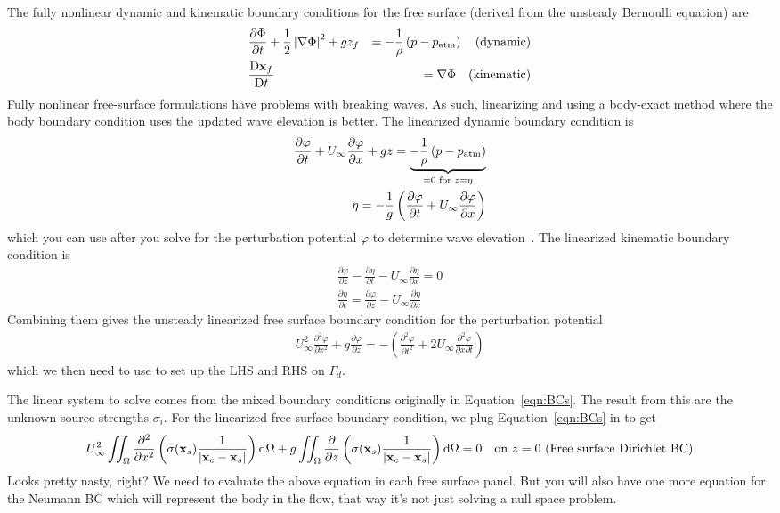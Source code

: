 \documentclass[10pt]{article}
\newcommand{\pp}[2]{\frac{\partial #1}{\partial #2}}
\newcommand{\ppt}[2]{\frac{\partial^2 #1}{\partial #2^2}}
\newcommand{\DD}[2]{\frac{\textrm{D} #1}{\textrm{D} #2}}
\newcommand{\mbf}[1]{\mathbf{#1}}
\newcommand{\half}{\frac{1}{2}}
\newcommand{\be}{\begin{eqnarray}}
\newcommand{\ee}{\end{eqnarray}}
\newcommand{\ben}{\begin{eqnarray*}}
\newcommand{\een}{\end{eqnarray*}}
\newcommand{\Uinf}{U_{\infty}}
\newcommand{\patm}{p_{\textrm{atm}}}
\newcommand{\tn}[1]{\textnormal{#1}}
\begin{document}
The fully nonlinear dynamic and kinematic boundary conditions for the free surface (derived from the unsteady Bernoulli equation) are
\be
\label{eqn:FSBC}
& {\pp{\Phi}{t}}
+ \half \left| \nabla \Phi \right|^2
+ gz_f
&=
-\frac{1}{\rho}\left(p - p_{\tn{atm}}\right)
\quad \tn{(dynamic)}
\\
& \DD{\mbf{x}_f}{t} & = \nabla \Phi \quad \tn{(kinematic)}
\ee
Fully nonlinear free-surface formulations have problems with breaking waves.
As such, linearizing and using a body-exact method where the body boundary condition uses the updated wave elevation is better.
The linearized dynamic boundary condition is
\be
\label{eqn:DFSBC}
{\pp{\varphi}{t}} + \Uinf\pp{\varphi}{x} + g z
=
\underbrace{
    -\frac{1}{\rho}\left(p - \patm\right)}_{=0 \tn{ for } z = \eta}
\\
\eta = -\frac{1}{g}
\left(
\pp{\varphi}{t} + \Uinf \pp{\varphi}{x}
\right)
\ee
which you can use after you solve for the perturbation potential $\varphi$ to determine wave elevation~\cite{Hess1967a}.
The linearized kinematic boundary condition is
\be
\label{eqn:KFSBC}
\pp{\varphi}{z} - \pp{\eta}{t} - \Uinf \pp{\eta}{x} = 0 \\
\pp{\eta}{t} = \pp{\varphi}{z} - \Uinf \pp{\eta}{x}
\ee
Combining them gives the unsteady linearized free surface boundary condition for the perturbation potential
\be
\label{eqn:LSFSBC}
\boxed{\Uinf^2 \ppt{\varphi}{x} + g\pp{\varphi}{z}}
= - \left( \ppt{\varphi}{t}
+ 2 \Uinf \frac{\partial^2 \varphi}{\partial x \partial t}
\right)
\ee
which we then need to use to set up the LHS and RHS on $\Gamma_d$.

The linear system to solve comes from the mixed boundary conditions originally in Equation~\eqref{eqn:BCs}.
The result from this are the unknown source strengths $\sigma_i$.
For the linearized free surface boundary condition, we plug Equation~\eqref{eqn:BCs} in to get
\be
\Uinf^2  \iint_{\Omega}\ppt{   }{x}
\left(
\sigma(\mbf{x}_s) \frac{1}{\left| \mbf{x}_c - \mbf{x}_s\right|}
\right)
\tn{d}\Omega
+ g
\iint_{\Omega} \pp{}{z} \left(
\sigma(\mbf{x}_s) \frac{1}{\left| \mbf{x}_c - \mbf{x}_s  \right| }
\right)
\tn{d}\Omega
= 0
\quad \tn{on } z=0 \tn{ (Free surface Dirichlet BC)}
\ee
Looks pretty nasty, right?
We need to evaluate the above equation in each free surface panel.
But you will also have one more equation for the Neumann BC which will represent the body in the flow, that way it's not just solving a null space problem.

\end{document}
